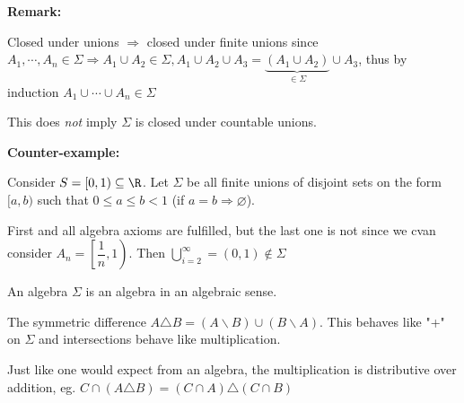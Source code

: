 \noindent\textbf{Remark:}\par
\noindent Closed under unions $\Rightarrow$ closed under finite unions since $A_1,\cdots, A_n\in\Sigma\Rightarrow A_1\cup A_2\in\Sigma, A_1\cup A_2\cup A_3 = \underbrace{(A_1\cup A_2)}_{\in\Sigma}\cup A_3$, thus by induction $A_1\cup\cdots\cup A_n\in\Sigma$
\par\bigskip
\noindent This does \textit{not} imply $\Sigma$ is closed under countable unions.
\par\bigskip
\noindent\textbf{Counter-example:}\par
\noindent Consider $S = [0,1)\subseteq\R$. Let $\Sigma$ be all finite unions of disjoint sets on the form $[a,b)$ such that $0\leq a\leq b<1$ (if $a=b\Rightarrow \varnothing$).\par
\noindent First and all algebra axioms are fulfilled, but the last one is not since we cvan consider $A_n = \left[\dfrac{1}{n}, 1\right)$. Then $\bigcup_{i=2}^{\infty} = (0,1)\not\in\Sigma$
\par\bigskip
\noindent An algebra $\Sigma$ is an algebra in an algebraic sense.\par
\noindent The symmetric difference $A\triangle B = (A\backslash B)\cup (B\backslash A)$. This behaves like "+" on $\Sigma$ and intersections behave like multiplication.\par
\noindent Just like one would expect from an algebra, the multiplication is distributive over addition, eg. $C\cap(A\triangle B) = (C\cap A)\triangle (C\cap B)$
\par\bigskip
